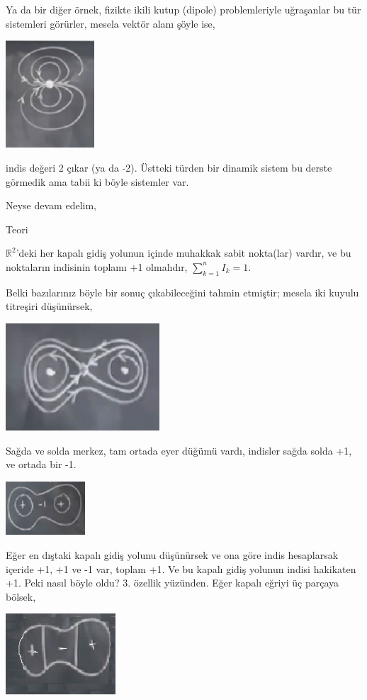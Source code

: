 \documentclass[12pt,fleqn]{article}\usepackage{../../common}
\begin{document}
Ya da bir diğer örnek, fizikte ikili kutup (dipole) problemleriyle uğraşanlar bu
tür sistemleri görürler, mesela vektör alanı şöyle ise,

\includegraphics[height=4cm]{08_31.png}

indis değeri 2 çıkar (ya da -2). Üstteki türden bir dinamik sistem bu derste
görmedik ama tabii ki böyle sistemler var. 

Neyse devam edelim,

Teori

$\mathbb{R}^2$'deki her kapalı gidiş yolunun içinde muhakkak sabit nokta(lar)
vardır, ve bu noktaların indisinin toplamı +1 olmalıdır, $\sum_{k=1}^{n} I_k =
1$.

Belki bazılarınız böyle bir sonuç çıkabileceğini tahmin etmiştir; mesela iki
kuyulu titreşiri düşünürsek,

\includegraphics[height=4cm]{08_32.png}

Sağda ve solda merkez, tam ortada eyer düğümü vardı, indisler sağda solda +1,
ve ortada bir -1.

\includegraphics[height=2cm]{08_33.png}

Eğer en dıştaki kapalı gidiş yolunu düşünürsek ve ona göre indis hesaplarsak
içeride +1, +1 ve -1 var, toplam +1. Ve bu kapalı gidiş yolunun indisi
hakikaten +1. Peki nasıl böyle oldu? 3. özellik yüzünden. Eğer kapalı eğriyi üç
parçaya bölsek, 

\includegraphics[height=3cm]{08_34.png}
\end{document}
